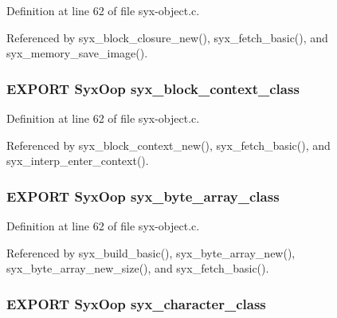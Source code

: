 Definition at line 62 of file syx-object.c.

Referenced by syx\_\-block\_\-closure\_\-new(), syx\_\-fetch\_\-basic(), and syx\_\-memory\_\-save\_\-image().\hypertarget{syx-object_8h_df59508211830ba19845fcf2e48dedad}{
\subsubsection{\setlength{\rightskip}{0pt plus 5cm}EXPORT {\bf SyxOop} {\bf syx\_\-block\_\-context\_\-class}}}
\label{syx-object_8h_df59508211830ba19845fcf2e48dedad}




Definition at line 62 of file syx-object.c.

Referenced by syx\_\-block\_\-context\_\-new(), syx\_\-fetch\_\-basic(), and syx\_\-interp\_\-enter\_\-context().\hypertarget{syx-object_8h_ee7c988bfeb850b7107cb7a3cc568cb7}{
\subsubsection{\setlength{\rightskip}{0pt plus 5cm}EXPORT {\bf SyxOop} {\bf syx\_\-byte\_\-array\_\-class}}}
\label{syx-object_8h_ee7c988bfeb850b7107cb7a3cc568cb7}




Definition at line 62 of file syx-object.c.

Referenced by syx\_\-build\_\-basic(), syx\_\-byte\_\-array\_\-new(), syx\_\-byte\_\-array\_\-new\_\-size(), and syx\_\-fetch\_\-basic().\hypertarget{syx-object_8h_0620595819b6972d75adf8c49cddfad9}{
\subsubsection{\setlength{\rightskip}{0pt plus 5cm}EXPORT {\bf SyxOop} {\bf syx\_\-character\_\-class}}}
\label{syx-object_8h_0620595819b6972d75adf8c49cddfad9}




